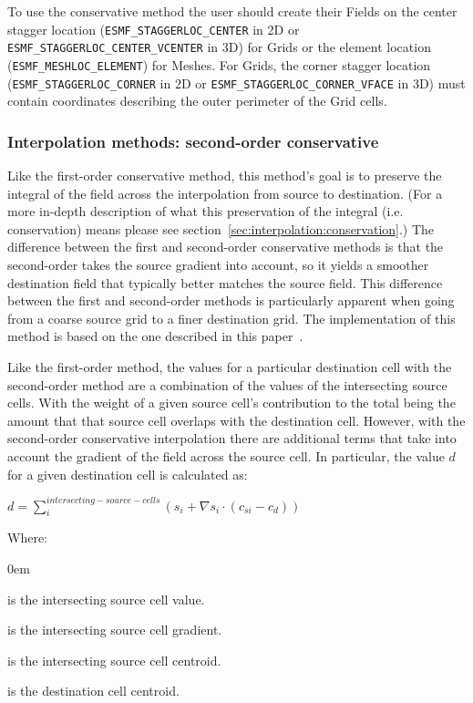\smallskip

 To use the conservative method the user should create their Fields on the center 
 stagger location ({\tt ESMF\_STAGGERLOC\_CENTER} in 2D or {\tt ESMF\_STAGGERLOC\_CENTER\_VCENTER} in 3D) for Grids  or the element location ({\tt ESMF\_MESHLOC\_ELEMENT}) for Meshes.
 For Grids, the corner stagger location ({\tt ESMF\_STAGGERLOC\_CORNER} in 2D or {\tt ESMF\_STAGGERLOC\_CORNER\_VFACE} in 3D) must contain coordinates describing the outer perimeter of the Grid cells. 

\subsubsection{Interpolation methods: second-order conservative}\label{sec:interpolation:conserve_2ndorder}
 Like the first-order conservative method, this method's goal is to preserve the integral of the field across the interpolation from source to destination.  
 (For a more in-depth description of what this preservation of the integral (i.e. conservation) means please see section~\ref{sec:interpolation:conservation}.)  The difference between the first and second-order conservative methods is that the second-order takes the source gradient into account, so
 it yields a smoother destination field that typically better matches the source field. This difference between the first and second-order methods 
 is particularly apparent when going from a coarse source grid to a finer destination grid. The implementation of this method is based on the one 
 described in this paper~\cite{ConservativeOrder2}.

 Like the first-order method, the values for a particular destination cell with the second-order method
 are a combination of the values of the intersecting source cells. With the weight of a given source cell's contribution to the total 
 being the amount that that source cell overlaps with the destination cell. 
 However, with the second-order conservative interpolation there are additional terms that take into account the gradient of the field 
 across the source cell. In particular, the value $d$ for a given destination cell is calculated as:
 
 $d=\sum^{intersecting-source-cells}_{i}(s_{i}+\nabla s_{i} \cdot (c_{si}-c_{d}))$

\smallskip

Where:
\vspace{-1em}
\begin{description}
  \itemsep0em
  \item[$s_{i}$] is the intersecting source cell value. 
  \item[$\nabla s_{i}$] is the intersecting source cell gradient. 
  \item[$c_{si}$] is the intersecting source cell centroid. 
  \item[$c_{d}$] is the destination cell centroid. 
\end{description}

